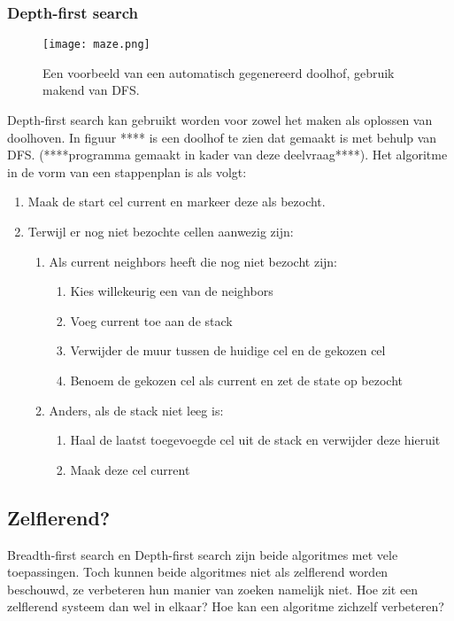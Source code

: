 \subsubsection{Depth-first search}
\begin{figure}[h]
  \centering
    \texttt{[image: maze.png]}
  \caption{Een voorbeeld van een automatisch gegenereerd doolhof, gebruik makend van DFS.}
  \label{fig:maze}
\end{figure}

Depth-first search kan gebruikt worden voor zowel het maken als oplossen van doolhoven. In figuur **** is een doolhof te zien dat gemaakt is met behulp van DFS. (****programma gemaakt in kader van deze deelvraag****). Het algoritme in de vorm van een stappenplan is als volgt:

\begin{enumerate}
\item Maak de start cel current en markeer deze als bezocht.
\item Terwijl er nog niet bezochte cellen aanwezig zijn:
	\begin{enumerate}
	\item Als current neighbors heeft die nog niet bezocht zijn:
		\begin{enumerate}
		\item Kies willekeurig een van de neighbors
		\item Voeg current toe aan de stack
		\item Verwijder de muur tussen de huidige cel en de gekozen cel
		\item Benoem de gekozen cel als current en zet de state op bezocht
		\end{enumerate}			
	
	\item Anders, als de stack niet leeg is:
		\begin{enumerate}
		\item Haal de laatst toegevoegde cel uit de stack en verwijder deze hieruit
		\item Maak deze cel current
		\end{enumerate}	
	\end{enumerate}
\end{enumerate}
\subsection{Zelflerend?}
Breadth-first search en Depth-first search zijn beide algoritmes met vele toepassingen. Toch kunnen beide algoritmes niet als zelflerend worden beschouwd, ze verbeteren hun manier van zoeken namelijk niet. Hoe zit een zelflerend systeem dan wel in elkaar? Hoe kan een algoritme zichzelf verbeteren?

